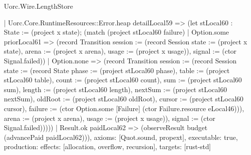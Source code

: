 \begin{lexlean}{Uorc.Wire.LengthStore}
\begin{semanticmodule}
{      | Uorc.Core.RuntimeResources::Error.heap detailLocal59 => (let stLocal60 : State := (project x state); (match (project stLocal60 failure)
        | Option.some priorLocal61 => (record Transition {session := (record Session {state := (project x state), arena := (project x arena), usage := (project x usage)}), signal := (ctor Signal.failed)})
        | Option.none => (record Transition {session := (record Session {state := (record State {phase := (project stLocal60 phase), table := (project stLocal60 table), count := (project stLocal60 count), sum := (project stLocal60 sum), length := (project stLocal60 length), nextSum := (project stLocal60 nextSum), oldRoot := (project stLocal60 oldRoot), cursor := (project stLocal60 cursor), failure := (ctor Option.some [Failure] (ctor Failure.resource eLocal46))}), arena := (project x arena), usage := (project x usage)}), signal := (ctor Signal.failed)}))))
    | Result.ok paidLocal62 => (observeResult budget (advancePaid paidLocal62))),
  axioms: [Quot.sound, propext],
  executable: true,
  production: {effects: [allocation, overflow, recursion], targets: [rust-std]}
}


\end{semanticmodule}
\end{lexlean}
